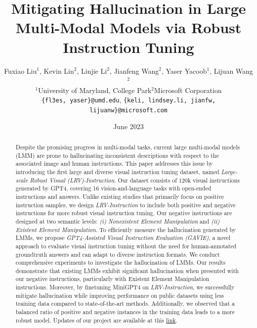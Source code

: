 \documentclass[letterpaper,10pt]{article}
\title{Mitigating Hallucination in Large Multi-Modal Models via Robust Instruction Tuning}
\author{%
 Fuxiao Liu$^1$, Kevin Lin$^2$, Linjie Li$^2$, Jianfeng Wang$^2$, Yaser Yacoob$^1$, Lijuan Wang$^2$\\ 
$^1$University of Maryland, College Park\quad $^2$Microsoft Corporation\\
\texttt{\small\{fl3es, yaser\}@umd.edu}, 
\texttt{\small\{keli, lindsey.li, jianfw, lijuanw\}@microsoft.com}
}
\date{June 2023}
\begin{document}
\maketitle

\begin{abstract}
Despite the promising progress in multi-modal tasks, current large multi-modal models (LMM) are prone to hallucinating inconsistent descriptions with respect to the associated image and human instructions. 
This paper addresses this issue by introducing the first large and diverse visual instruction tuning dataset, named \textit{Large-scale Robust Visual (LRV)-Instruction}.
Our dataset consists of 120k visual instructions generated by GPT4, covering 16 vision-and-language tasks with open-ended instructions and answers. 
Unlike existing studies that primarily focus on positive instruction samples, we design \textit{LRV-Instruction} to include both positive and negative instructions for more robust visual instruction tuning.
Our negative instructions are designed at two semantic levels: \textit{(i) Nonexistent Element Manipulation} and \textit{(ii) Existent Element Manipulation}. To efficiently measure the hallucination generated by LMMs, we propose \textit{GPT4-Assisted Visual Instruction Evaluation (GAVIE)}, a novel approach to evaluate visual instruction tuning without the need for human-annotated groundtruth answers and can adapt to diverse instruction formats. We conduct comprehensive experiments to investigate the hallucination of LMMs. 
Our results demonstrate that existing LMMs exhibit significant hallucination when presented with our negative instructions, particularly with Existent Element Manipulation instructions.
Moreover, by finetuning MiniGPT4 on \textit{LRV-Instruction}, 
we successfully mitigate hallucination while improving performance on public datasets using less training data compared to state-of-the-art methods.
Additionally, we observed that a balanced ratio of positive and negative instances in the training data leads to a more robust model. Updates of our project are available at this \href{https://fuxiaoliu.github.io/LRV/}{link}. 

\end{abstract}
\end{document}
